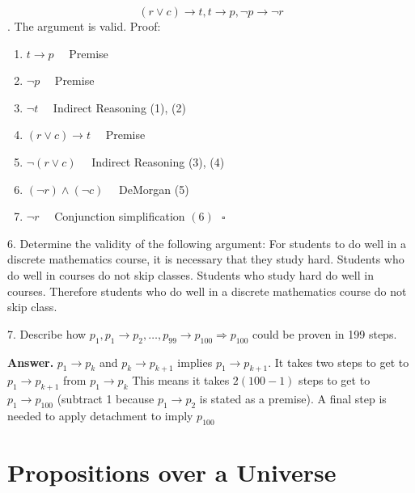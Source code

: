 \documentclass[10pt,]{book}
\theoremstyle{plain}
\theoremstyle{definition}
\theoremstyle{definition}
\theoremstyle{definition}
\theoremstyle{definition}
\begin{document}
\begin{exercisegroup}
\begin{enumerate}[label=\alph*]
\[(r\lor c)\to t, t\to p, \neg p\to \neg r\]. The argument is valid. Proof:%
\par
%
\begin{enumerate}[label=\arabic*]
\item\hypertarget{li-225}{} \(t\to p\quad \)   Premise%
\item\hypertarget{li-226}{} \(\neg p\quad \)   Premise%
\item\hypertarget{li-227}{} \(\neg t\quad \)   Indirect Reasoning (1), (2)%
\item\hypertarget{li-228}{} \((r\lor c)\to t\quad \)     Premise%
\item\hypertarget{li-229}{} \(\neg (r\lor c)\quad \)   Indirect Reasoning (3), (4)%
\item\hypertarget{li-230}{} \((\neg r)\land (\neg c)\quad \)   DeMorgan (5)%
\item\hypertarget{li-231}{} \(\neg r\quad \)     Conjunction simplification \((6)\text{    }\square\)%
\end{enumerate}
%
\end{enumerate}
%
\item[6.]\hypertarget{exercise-29}{}Determine the validity of the following argument: For students to do well in a discrete mathematics course, it is necessary that they study hard.
Students who do well in courses do not skip classes. Students who study hard do well in courses. Therefore students who do well in a discrete mathematics
course do not skip class.%
\par\smallskip
\item[7.]\hypertarget{exercise-30}{}Describe how \(p_1,p_1\to p_2,\ldots  ,p_{99}\to p_{100}\Rightarrow p_{100}\) could be proven in 199 steps.
%
\par\smallskip
\par\smallskip
\noindent\textbf{Answer.}\hypertarget{answer-14}{}\quad
 \(p_1\to p_k\) and \(p_k\to p_{k+1}\) implies \(p_1\to p_{k+1}\). It takes two steps to get to \(p_1\to p_{k+1}\) from \(p_1\to p_k\) This means it takes \(2(100-1)\) steps to get to \(p_1\to p_{100}\) (subtract 1 because \(p_1\to p_2\) is stated as a premise). A final step is needed to apply detachment to imply \(p_{100}\)%
\end{exercisegroup}
\par\smallskip\noindent
\typeout{************************************************}
\typeout{************************************************}
\section[Propositions over a Universe]{Propositions over a Universe}\label{c3s6}
\typeout{************************************************}
\typeout{************************************************}
\end{document}
